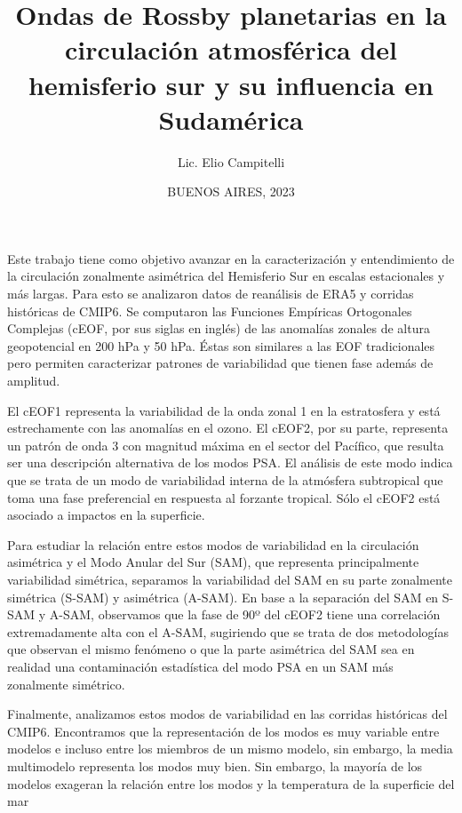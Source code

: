 \documentclass[12pt,oneside]{reedthesis}
\title{Ondas de Rossby planetarias en la circulación atmosférica del hemisferio sur y su influencia en Sudamérica}
\author{Lic. Elio Campitelli}
\date{BUENOS AIRES, 2023}
\begin{document}
  \maketitle

\frontmatter %
\pagestyle{empty} %


  \begin{resumen}
    Este trabajo tiene como objetivo avanzar en la caracterización y entendimiento de la circulación zonalmente asimétrica del Hemisferio Sur en escalas estacionales y más largas.
    Para esto se analizaron datos de reanálisis de ERA5 y corridas históricas de CMIP6.
    Se computaron las Funciones Empíricas Ortogonales Complejas (cEOF, por sus siglas en inglés) de las anomalías zonales de altura geopotencial en 200 hPa y 50 hPa.
    Éstas son similares a las EOF tradicionales pero permiten caracterizar patrones de variabilidad que tienen fase además de amplitud.

    El cEOF1 representa la variabilidad de la onda zonal 1 en la estratosfera y está estrechamente con las anomalías en el ozono.
    El cEOF2, por su parte, representa un patrón de onda 3 con magnitud máxima en el sector del Pacífico, que resulta ser una descripción alternativa de los modos PSA.
    El análisis de este modo indica que se trata de un modo de variabilidad interna de la atmósfera subtropical que toma una fase preferencial en respuesta al forzante tropical.
    Sólo el cEOF2 está asociado a impactos en la superficie.

    Para estudiar la relación entre estos modos de variabilidad en la circulación asimétrica y el Modo Anular del Sur (SAM), que representa principalmente variabilidad simétrica, separamos la variabilidad del SAM en su parte zonalmente simétrica (S-SAM) y asimétrica (A-SAM).
    En base a la separación del SAM en S-SAM y A-SAM, observamos que la fase de 90º del cEOF2 tiene una correlación extremadamente alta con el A-SAM, sugiriendo que se trata de dos metodologías que observan el mismo fenómeno o que la parte asimétrica del SAM sea en realidad una contaminación estadística del modo PSA en un SAM más zonalmente simétrico.

    Finalmente, analizamos estos modos de variabilidad en las corridas históricas del CMIP6.
    Encontramos que la representación de los modos es muy variable entre modelos e incluso entre los miembros de un mismo modelo, sin embargo, la media multimodelo representa los modos muy bien.
    Sin embargo, la mayoría de los modelos exageran la relación entre los modos y la temperatura de la superficie del mar
  \end{resumen}
\end{document}
